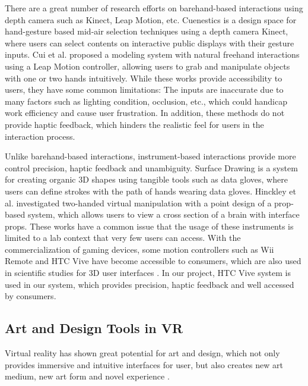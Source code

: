 \documentclass{svjour3}                     %
\begin{document}
There are a great number of research efforts \cite{walter2014cuenesics,cui2016exploration,ramani2015gesture,murugappan2013handy,han2014virtual} on barehand-based interactions using depth camera such as Kinect, Leap Motion, etc.
Cuenestics \cite{walter2014cuenesics} is a design space for hand-gesture based mid-air selection techniques using a depth camera Kinect, where users can select contents on interactive public displays with their gesture inputs.
Cui et al. \cite{cui2016exploration} proposed a modeling system with natural freehand interactions using a Leap Motion controller, allowing users to grab and manipulate objects with one or two hands intuitively.
While these works provide accessibility to users, they have some common limitations: The inputs are inaccurate due to many factors such as lighting condition, occlusion, etc., which could handicap work efficiency and cause user frustration.
In addition, these methods do not provide haptic feedback, which hinders the realistic feel for users in the interaction process.

Unlike barehand-based interactions, instrument-based interactions provide more control precision, haptic feedback and unambiguity.
Surface Drawing \cite{schkolne2001surface} is a system for creating organic 3D shapes using tangible tools such as data gloves, where users can define strokes with the path of hands wearing data gloves.
Hinckley et al. \cite{hinckley1998two} investigated two-handed virtual manipulation with a point design of a prop-based system, which allows users to view a cross section of a brain with interface props.
These works have a common issue that the usage of these instruments is limited to a lab context that very few users can access.
%
With the commercialization of gaming devices, some motion controllers such as Wii Remote and HTC Vive have become accessible to consumers, which are also used in scientific studies for 3D user interfaces \cite{wingcrave2010wii,niehorster2017accuracy}.
%
In our project, HTC Vive system is used in our system, which provides precision, haptic feedback and well accessed by consumers.

\subsection{Art and Design Tools in VR}
\label{sec:art}
Virtual reality has shown great potential for art and design, which not only provides immersive and intuitive interfaces for user, but also creates new art medium, new art form and novel experience \cite{laviola20113d}.
\end{document}
